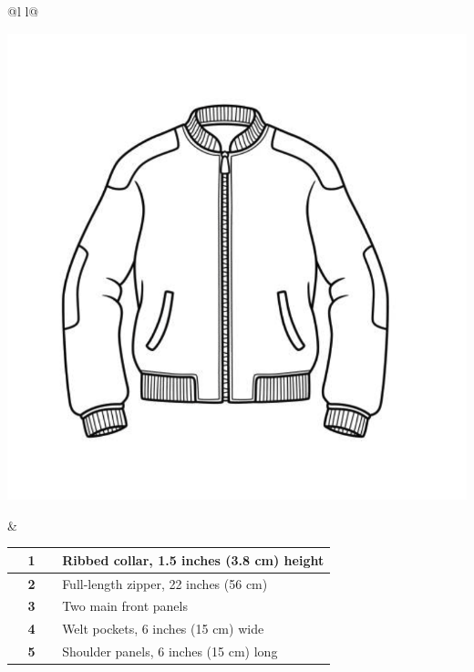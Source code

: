\documentclass[11pt,a4paper]{article}
\begin{document}
\begin{table}[H]
\centering
\begin{tabular}{@{}l l@{}}
\begin{minipage}[t]{0.5\linewidth}
  \vspace{0pt} %
  \includegraphics[width=\linewidth]{Screenshot_2025-03-09_at_22.37.32.png}
\end{minipage}
&
\begin{minipage}[t]{0.5\linewidth}
  \vspace{0pt} %
  \begin{tabular}{|c|p{0.85\linewidth}|}
    \hline
    \textbf{1} & Ribbed collar, 1.5 inches (3.8 cm) height \\ \hline
    \textbf{2} & Full-length zipper, 22 inches (56 cm) \\ \hline
    \textbf{3} & Two main front panels \\ \hline
    \textbf{4} & Welt pockets, 6 inches (15 cm) wide \\ \hline
    \textbf{5} & Shoulder panels, 6 inches (15 cm) long \\ \hline
  \end{tabular}
\end{minipage}
\end{tabular}
\end{table}
\end{document}
